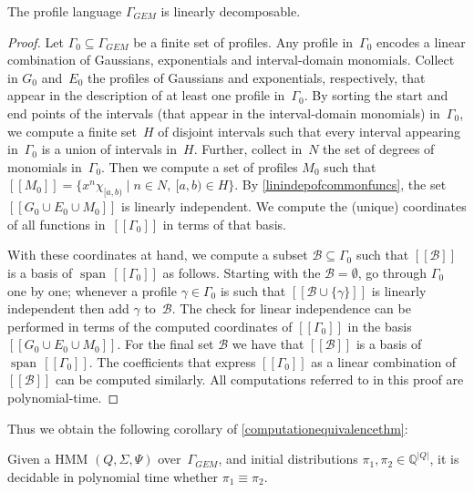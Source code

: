 \documentclass[a4paper,UKenglish,cleveref, autoref,mathscr]{lipics-v2019}
\newcommand{\QQ}{\mathbb{Q}}
\newcommand{\1}{\mathbbm{1}}
\newcommand{\pl}{\Gamma_{\mathit{GEM}}}
\DeclareMathOperator{\Span}{span\,}
\begin{document}
\begin{proposition}\label{commonfuncslineardecomp}
The profile language $\pl$ is linearly decomposable.
\end{proposition}
\begin{proof}
Let $\Gamma_0 \subseteq \pl$ be a finite set of profiles.
Any profile in~$\Gamma_0$ encodes a linear combination of Gaussians, exponentials and interval-domain monomials.
Collect in $G_0$ and~$E_0$ the profiles of Gaussians and exponentials, respectively, that appear in the description of at least one profile in~$\Gamma_0$.
By sorting the start and end points of the intervals (that appear in the interval-domain monomials) in~$\Gamma_0$, we compute a finite set~$H$ of disjoint intervals such that every interval appearing in~$\Gamma_0$ is a union of intervals in~$H$.
Further, collect in~$N$ the set of degrees of monomials in~$\Gamma_0$.
Then we compute a set of profiles $M_0$ such that $[\![M_0]\!] = \{x^n \chi_{[a,b)} \mid n \in N,\ [a,b) \in H\}$.
By \cref{linindepofcommonfuncs}, the set $[\![G_0 \cup E_0 \cup M_0]\!]$ is linearly independent.
We compute the (unique) coordinates of all functions in~$[\![\Gamma_0]\!]$ in terms of that basis.

With these coordinates at hand, we compute a subset $\mathcal{B} \subseteq \Gamma_0$ such that $[\![\mathcal{B}]\!]$ is a basis of $\Span [\![\Gamma_0]\!]$ as follows.
Starting with the $\mathcal{B} = \emptyset$, go through $\Gamma_0$ one by one; whenever a profile $\gamma \in \Gamma_0$ is such that $[\![\mathcal{B} \cup \{\gamma\}]\!]$ is linearly independent then add $\gamma$ to~$\mathcal{B}$.
The check for linear independence can be performed in terms of the computed coordinates of $[\![\Gamma_0]\!]$ in the basis $[\![G_0 \cup E_0 \cup M_0]\!]$.
For the final set $\mathcal{B}$ we have that $[\![\mathcal{B}]\!]$ is a basis of $\Span [\![\Gamma_0]\!]$.
The coefficients that express $[\![\Gamma_0]\!]$ as a linear combination of~$[\![\mathcal{B}]\!]$ can be computed similarly.
All computations referred to in this proof are polynomial-time.
\end{proof}
Thus we obtain the following corollary of \cref{computationequivalencethm}:
\begin{corollary}
Given a HMM $(Q, \Sigma, \Psi)$ over~$\pl$, and initial distributions $\pi_1, \pi_2 \in \QQ^{|Q|}$, it is decidable in polynomial time whether $\pi_1 \equiv \pi_2$.
\end{corollary}
\end{document}
